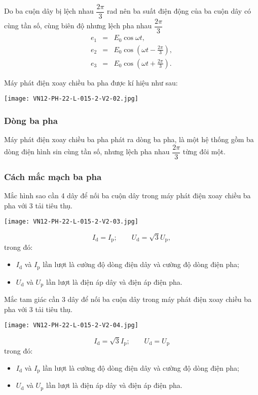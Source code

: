 Do ba cuộn dây bị lệch nhau $\dfrac{2\pi}{3}$ rad nên ba suất điện động của ba cuộn dây có cùng tần số, cùng biên độ nhưng lệch pha nhau $\dfrac{2\pi}{3}$
\begin{eqnarray*}
	e_1&=&E_0\cos\omega t,\\
	e_2&=&E_0\cos\left( \omega t -\frac{2\pi}{3}\right) ,\\ e_3&=&E_0\cos\left( \omega t +\frac{2\pi}{3}\right).
\end{eqnarray*}

Máy phát điện xoay chiều ba pha được kí hiệu như sau:
\begin{center}
	\texttt{[image: VN12-PH-22-L-015-2-V2-02.jpg]}
\end{center}
\subsubsection{Dòng ba pha}
Máy phát điện xoay chiều ba pha phát ra dòng ba pha, là một hệ thống gồm ba dòng điện hình sin cùng tần số, nhưng lệch pha nhau $\dfrac{2\pi}{3}$ từng đôi một. 
\subsubsection{Cách mắc mạch ba pha} 

Mắc hình sao cần 4 dây để nối ba cuộn dây trong máy phát điện xoay chiều ba pha với 3 tải tiêu thụ. 
\begin{center}
	\texttt{[image: VN12-PH-22-L-015-2-V2-03.jpg]}
\end{center}
\begin{equation*}
	I_\text{d}=I_\text{p};\qquad U_\text{d}=\sqrt 3 U_\text{p},
\end{equation*}
trong đó:
\begin{itemize}
	\item $I_\text{d}$ và $I_\text{p}$ lần lượt là cường độ dòng điện dây và cường độ dòng điện pha;
	\item $U_\text{d}$ và $U_\text{p}$ lần lượt là điện áp dây và điện áp điện pha.
\end{itemize}

Mắc tam giác cần 3 dây để nối ba cuộn dây trong máy phát điện xoay chiều ba pha với 3 tải tiêu thụ.
\begin{center}
	\texttt{[image: VN12-PH-22-L-015-2-V2-04.jpg]}
\end{center}
\begin{equation*}
	I_\text{d}=\sqrt 3 I_\text{p}; \qquad U_\text{d}=U_\text{p}
\end{equation*}
trong đó:
\begin{itemize}
	\item $I_\text{d}$ và $I_\text{p}$ lần lượt là cường độ dòng điện dây và cường độ dòng điện pha;
	\item $U_\text{d}$ và $U_\text{p}$ lần lượt là điện áp dây và điện áp điện pha.
\end{itemize}


